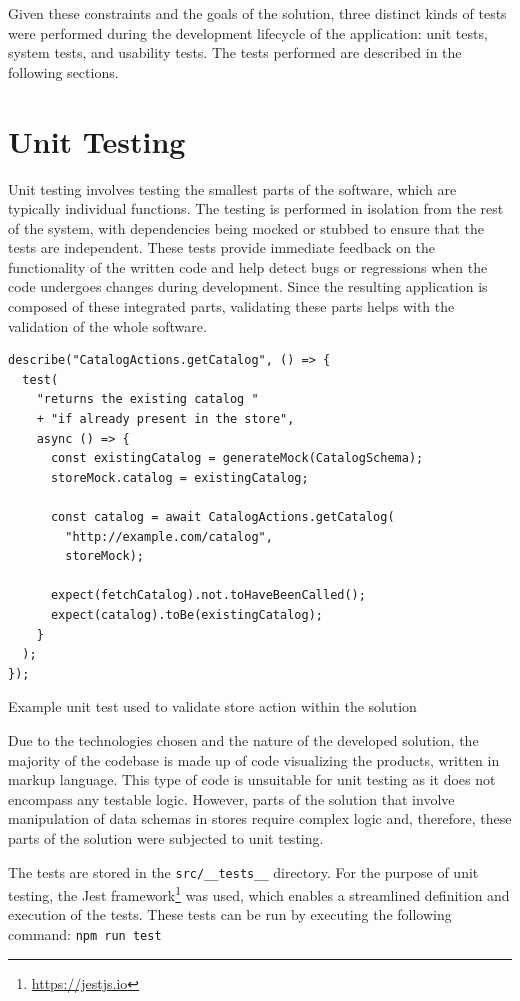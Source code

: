 Given these constraints and the goals of the solution, three distinct kinds of tests were performed during the development lifecycle of the application: unit tests, system tests, and usability tests. The tests performed are described in the following sections.


\section{Unit Testing}

Unit testing involves testing the smallest parts of the software, which are typically individual functions. The testing is performed in isolation from the rest of the system, with dependencies being mocked or stubbed to ensure that the tests are independent. These tests provide immediate feedback on the functionality of the written code and help detect bugs or regressions when the code undergoes changes during development. Since the resulting application is composed of these integrated parts, validating these parts helps with the validation of the whole software.~\cite{Khorikov2020}

\begin{listing}[h!]
\begin{verbatim}
describe("CatalogActions.getCatalog", () => {
  test(
    "returns the existing catalog " 
    + "if already present in the store",
    async () => {
      const existingCatalog = generateMock(CatalogSchema);
      storeMock.catalog = existingCatalog;

      const catalog = await CatalogActions.getCatalog(
        "http://example.com/catalog",
        storeMock);

      expect(fetchCatalog).not.toHaveBeenCalled();
      expect(catalog).toBe(existingCatalog);
    }
  );
});
\end{verbatim}
\caption{Example unit test used to validate store action within the solution}
\label{listing:unit-test}
\end{listing}

Due to the technologies chosen and the nature of the developed solution, the majority of the codebase is made up of code visualizing the products, written in markup language. This type of code is unsuitable for unit testing as it does not encompass any testable logic. However, parts of the solution that involve manipulation of data schemas in stores require complex logic and, therefore, these parts of the solution were subjected to unit testing.

The tests are stored in the \texttt{src/\_\_tests\_\_} directory. For the purpose of unit testing, the Jest framework\footnote{\url{https://jestjs.io}} was used, which enables a streamlined definition and execution of the tests. These tests can be run by executing the following command: \texttt{npm run test}

